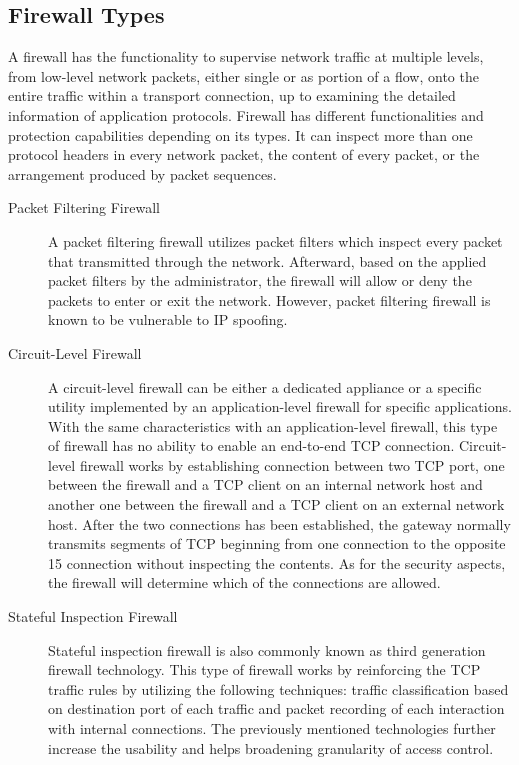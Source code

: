 \documentclass[../index.tex]{subfiles}
\begin{document}
\subsection{Firewall Types}

A firewall has the functionality to supervise network traffic at multiple levels, from low-level
network packets, either single or as portion of a flow, onto the entire traffic within a transport
connection, up to examining the detailed information of application protocols. Firewall has
different functionalities and protection capabilities depending on its types. It can inspect more
than one protocol headers in every network packet, the content of every packet, or the arrangement
produced by packet sequences.

\begin{description}

  \item[Packet Filtering Firewall] A packet filtering firewall utilizes packet filters which inspect
    every packet that transmitted through the network. Afterward, based on the applied packet
    filters by the administrator, the firewall will allow or deny the packets to enter or exit the
    network. However, packet filtering firewall is known to be vulnerable to IP spoofing.

  \item[Circuit-Level Firewall] A circuit-level firewall can be either a dedicated appliance or a
    specific utility implemented by an application-level firewall for specific applications. With
    the same characteristics with an application-level firewall, this type of firewall has no
    ability to enable an end-to-end TCP connection. Circuit-level firewall works by establishing
    connection between two TCP port, one between the firewall and a TCP client on an internal
    network host and another one between the firewall and a TCP client on an external network host.
    After the two connections has been established, the gateway normally transmits segments of TCP
    beginning from one connection to the opposite 15 connection without inspecting the contents. As
    for the security aspects, the firewall will determine which of the connections are allowed.

  \item[Stateful Inspection Firewall] Stateful inspection firewall is also commonly known as third
    generation firewall technology. This type of firewall works by reinforcing the TCP traffic rules
    by utilizing the following techniques: traffic classification based on destination port of each
    traffic and packet recording of each interaction with internal connections. The previously
    mentioned technologies further increase the usability and helps broadening granularity of access
    control.


\end{description}
\end{document}

